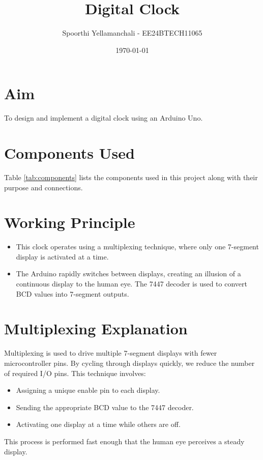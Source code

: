 \documentclass{article}
\title{\textbf{Digital Clock}}
\author{Spoorthi Yellamanchali - EE24BTECH11065}
\date{\today}
\begin{document}
\maketitle



\section{Aim}
 To design and implement  a digital clock using an Arduino Uno.

\section{Components Used}
Table \ref{tab:components} lists the components used in this project along with their purpose and connections.



\section{Working Principle}
\begin{itemize}
    \item This clock operates using a multiplexing technique, where only one 7-segment display is activated at a time.
    \item The Arduino rapidly switches between displays, creating an illusion of a continuous display to the human eye. The 7447 decoder is used to convert BCD values into 7-segment outputs.
\end{itemize}
 

\section{Multiplexing Explanation}
Multiplexing is used to drive multiple 7-segment displays with fewer microcontroller pins. By cycling through displays quickly, we reduce the number of required I/O pins. This technique involves:
\begin{itemize}
    \item Assigning a unique enable pin to each display.
    \item Sending the appropriate BCD value to the 7447 decoder.
    \item Activating one display at a time while others are off.
\end{itemize}
This process is performed fast enough that the human eye perceives a steady display.
\end{document}
